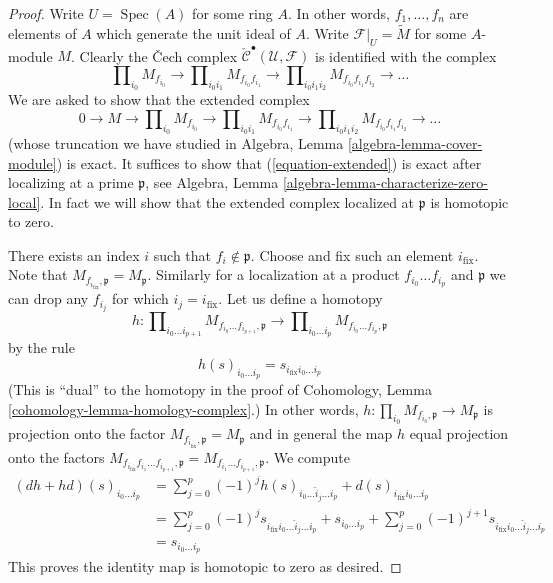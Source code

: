 \documentclass{stacks-project}
\theoremstyle{plain}
\theoremstyle{definition}
\theoremstyle{remark}
\numberwithin{equation}{subsection}
\def\Spec{\mathop{\mathrm{Spec}}}
\begin{document}
\begin{proof}
Write $U = \Spec(A)$ for some ring $A$.
In other words, $f_1, \ldots, f_n$ are elements of $A$
which generate the unit ideal of $A$.
Write $\mathcal{F}|_U = \widetilde{M}$ for some $A$-module $M$.
Clearly the {\v C}ech complex
$\check{\mathcal{C}}^\bullet(\mathcal{U}, \mathcal{F})$
is identified with the complex
$$
\prod\nolimits_{i_0} M_{f_{i_0}} \to
\prod\nolimits_{i_0i_1} M_{f_{i_0}f_{i_1}} \to
\prod\nolimits_{i_0i_1i_2} M_{f_{i_0}f_{i_1}f_{i_2}} \to
\ldots
$$
We are asked to show that the extended complex
\begin{equation}
\label{equation-extended}
0 \to
M \to
\prod\nolimits_{i_0} M_{f_{i_0}} \to
\prod\nolimits_{i_0i_1} M_{f_{i_0}f_{i_1}} \to
\prod\nolimits_{i_0i_1i_2} M_{f_{i_0}f_{i_1}f_{i_2}} \to
\ldots
\end{equation}
(whose truncation we have studied in
Algebra, Lemma \ref{algebra-lemma-cover-module}) is exact.
It suffices to show that (\ref{equation-extended})
is exact after localizing at a prime $\mathfrak p$, see
Algebra, Lemma \ref{algebra-lemma-characterize-zero-local}.
In fact we will show that the extended complex localized
at $\mathfrak p$ is homotopic to zero.

\medskip\noindent
There exists an index $i$ such that $f_i \not \in \mathfrak p$.
Choose and fix such an element $i_{\text{fix}}$. Note that
$M_{f_{i_{\text{fix}}}, \mathfrak p} = M_{\mathfrak p}$. Similarly
for a localization at a product $f_{i_0} \ldots f_{i_p}$ and $\mathfrak p$
we can drop any $f_{i_j}$ for which $i_j = i_{\text{fix}}$.
Let us define a homotopy
$$
h :
\prod\nolimits_{i_0 \ldots i_{p + 1}}
M_{f_{i_0} \ldots f_{i_{p + 1}}, \mathfrak p}
\longrightarrow
\prod\nolimits_{i_0 \ldots i_p}
M_{f_{i_0} \ldots f_{i_p}, \mathfrak p}
$$
by the rule
$$
h(s)_{i_0 \ldots i_p} = s_{i_{\text{fix}} i_0 \ldots i_p}
$$
(This is ``dual'' to the homotopy in the proof of
Cohomology, Lemma \ref{cohomology-lemma-homology-complex}.)
In other words, $h : \prod_{i_0} M_{f_{i_0}, \mathfrak p} \to M_\mathfrak p$
is projection onto the factor
$M_{f_{i_{\text{fix}}}, \mathfrak p} = M_{\mathfrak p}$ and in general
the map $h$ equal projection onto the factors
$M_{f_{i_{\text{fix}}} f_{i_1} \ldots f_{i_{p + 1}}, \mathfrak p}
= M_{f_{i_1} \ldots f_{i_{p + 1}}, \mathfrak p}$. We compute
\begin{align*}
(dh + hd)(s)_{i_0 \ldots i_p}
& =
\sum\nolimits_{j = 0}^p
(-1)^j
h(s)_{i_0 \ldots \hat i_j \ldots i_p}
+
d(s)_{i_{\text{fix}} i_0 \ldots i_p}\\
& =
\sum\nolimits_{j = 0}^p
(-1)^j
s_{i_{\text{fix}} i_0 \ldots \hat i_j \ldots i_p}
+
s_{i_0 \ldots i_p}
+
\sum\nolimits_{j = 0}^p
(-1)^{j + 1}
s_{i_{\text{fix}} i_0 \ldots \hat i_j \ldots i_p} \\
& =
s_{i_0 \ldots i_p}
\end{align*}
This proves the identity map is homotopic to zero as desired.
\end{proof}
\end{document}
